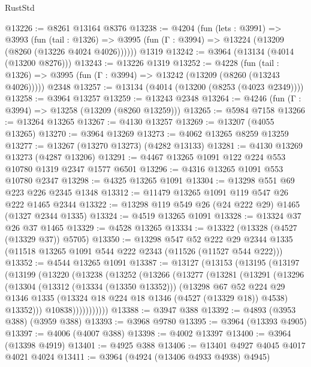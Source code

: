 \begin{lexlean}{RustStd}
\begin{coremodule}
{\begin{coremodule}
{{{{{{{{{{{{{{{{{{{{{{{{{{{{{{{{{{{{{{@13226 := @8261 @13164 @8376
@13238 := @4204
    (fun (lets : @3991) =>
    @3993
      (fun (tail : @1326) =>
      @3995 (fun (Γ : @3994) => @13224 (@13209 (@8260 (@13226 @4024 @4026))))))
    @1319
@13242 := @3964 (@13134 (@4014 (@13200 @8276)))
@13243 := @13226 @1319
@13252 := @4228
    (fun (tail : @1326) => @3995 (fun (Γ : @3994) => @13242 (@13209 (@8260 (@13243 @4026)))))
    @2348
@13257 := @13134 (@4014 (@13200 (@8253 (@4023 @2349))))
@13258 := @3964 @13257
@13259 := @13243 @2348
@13264 := @4246 (fun (Γ : @3994) => @13258 (@13209 (@8260 @13259)))
@13265 := @5984 @7158
@13266 := @13264 @13265
@13267 := @4130 @13257
@13269 := @13207 (@4055 @13265)
@13270 := @3964 @13269
@13273 := @4062 @13265 @8259 @13259
@13277 := @13267 (@13270 @13273) (@4282 @13133)
@13281 := @4130 @13269 @13273 (@4287 @13206)
@13291 := @4467 @13265 @1091 @122 @224 @553 @10780 @1319 @2347 @1577 @6501
@13296 := @4316 @13265 @1091 @553 @10780 @2347
@13298 := @4325 @13265 @1091
@13304 := @13298 @551 @69 @223 @226 @2345 @1348
@13312 := @11479 @13265 @1091 @119 @547 @26 @222 @1465 @2344
@13322 := @13298 @119 @549 @26 (@24 @222 @29) @1465 (@1327 @2344 @1335)
@13324 := @4519 @13265 @1091
@13328 := @13324 @37 @26 @37 @1465
@13329 := @4528 @13265
@13334 := @13322 (@13328 (@4527 (@13329 @37)) @5705)
@13350 := @13298
    @547
    @52
    @222
    @29
    @2344
    @1335
    (@11518 @13265 @1091 @544 @222 @2343 (@11526 (@11527 @544 @222)))
@13352 := @4544 @13265 @1091
@13387 := @13127
    (@13153
      (@13195
        (@13197
          (@13199
            (@13220
              (@13238
                (@13252
                  (@13266
                    (@13277
                      (@13281
                        (@13291
                          (@13296
                            (@13304
                              (@13312 (@13334 (@13350 @13352)))
                              (@13298
                                @67
                                @52
                                @224
                                @29
                                @1346
                                @1335
                                (@13324 @18 @224 @18 @1346 (@4527 (@13329 @18)) @4538)
                                @13352)))
                          @10838)))))))))))
@13388 := @3947 @388
@13392 := @4893 (@3953 @388) (@3959 @388)
@13393 := @3968 @9780
@13395 := @3964 (@13393 @4905)
@13397 := @4006 (@4007 @388)
@13398 := @4002 @13397
@13400 := @3964 (@13398 @4919)
@13401 := @4925 @388
@13406 := @13401 @4927 @4045 @4017 @4021 @4024
@13411 := @3964 (@4924 (@13406 @4933 @4938) @4945)
}}}}}}}}}}}}}}}}}}}}}}}}}}}}}}}}}}}}}}
\end{coremodule}}
\end{coremodule}
\end{lexlean}

